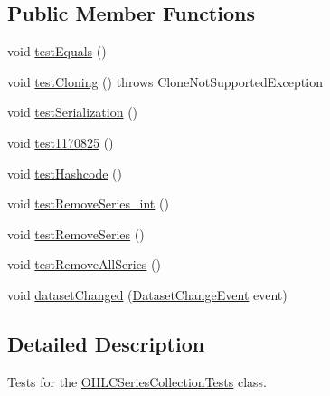 \subsection*{Public Member Functions}
\begin{DoxyCompactItemize}
\item 
void \mbox{\hyperlink{classorg_1_1jfree_1_1data_1_1time_1_1ohlc_1_1_o_h_l_c_series_collection_test_afb2168844e838d356db094b38d55d283}{test\+Equals}} ()
\item 
void \mbox{\hyperlink{classorg_1_1jfree_1_1data_1_1time_1_1ohlc_1_1_o_h_l_c_series_collection_test_a3653ce5ab520d81a21c72d6b32bd0a35}{test\+Cloning}} ()  throws Clone\+Not\+Supported\+Exception 
\item 
void \mbox{\hyperlink{classorg_1_1jfree_1_1data_1_1time_1_1ohlc_1_1_o_h_l_c_series_collection_test_a429a5223f5ed8bfa4f296ebedce71ed1}{test\+Serialization}} ()
\item 
void \mbox{\hyperlink{classorg_1_1jfree_1_1data_1_1time_1_1ohlc_1_1_o_h_l_c_series_collection_test_ab771fef4f7fbe216c15d6e9bb9f77596}{test1170825}} ()
\item 
void \mbox{\hyperlink{classorg_1_1jfree_1_1data_1_1time_1_1ohlc_1_1_o_h_l_c_series_collection_test_ab9f07ceca9beabc4e961b739f1d0db27}{test\+Hashcode}} ()
\item 
void \mbox{\hyperlink{classorg_1_1jfree_1_1data_1_1time_1_1ohlc_1_1_o_h_l_c_series_collection_test_a26d5ffe30beccce99f48003a9513ad0a}{test\+Remove\+Series\+\_\+int}} ()
\item 
void \mbox{\hyperlink{classorg_1_1jfree_1_1data_1_1time_1_1ohlc_1_1_o_h_l_c_series_collection_test_ad583c6c2ac8ff9b780ecde72a62dba57}{test\+Remove\+Series}} ()
\item 
void \mbox{\hyperlink{classorg_1_1jfree_1_1data_1_1time_1_1ohlc_1_1_o_h_l_c_series_collection_test_aa5a53ed65a4e881d4ded279d43d88c48}{test\+Remove\+All\+Series}} ()
\item 
void \mbox{\hyperlink{classorg_1_1jfree_1_1data_1_1time_1_1ohlc_1_1_o_h_l_c_series_collection_test_af113a690321427d2eed1dc0815dca2fe}{dataset\+Changed}} (\mbox{\hyperlink{classorg_1_1jfree_1_1data_1_1general_1_1_dataset_change_event}{Dataset\+Change\+Event}} event)
\end{DoxyCompactItemize}


\subsection{Detailed Description}
Tests for the \mbox{\hyperlink{}{O\+H\+L\+C\+Series\+Collection\+Tests}} class. 

